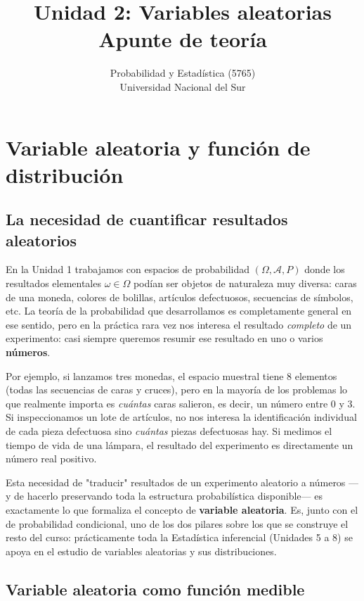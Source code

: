 \documentclass[11pt,a4paper]{article}
\title{Unidad 2: Variables aleatorias \\ \large Apunte de teoría}
\author{Probabilidad y Estadística (5765) \\ Universidad Nacional del Sur}
\date{}
\theoremstyle{plain}
\theoremstyle{definition}
\theoremstyle{remark}
\begin{document}
\maketitle
\tableofcontents
\newpage

\section{Variable aleatoria y función de distribución}

\subsection{La necesidad de cuantificar resultados aleatorios}

En la Unidad 1 trabajamos con espacios de probabilidad $(\Omega,\mathcal{A},P)$ donde los resultados elementales $\omega\in\Omega$ podían ser objetos de naturaleza muy diversa: caras de una moneda, colores de bolillas, artículos defectuosos, secuencias de símbolos, etc. La teoría de la probabilidad que desarrollamos es completamente general en ese sentido, pero en la práctica rara vez nos interesa el resultado \emph{completo} de un experimento: casi siempre queremos resumir ese resultado en uno o varios \textbf{números}.

Por ejemplo, si lanzamos tres monedas, el espacio muestral tiene $8$ elementos (todas las secuencias de caras y cruces), pero en la mayoría de los problemas lo que realmente importa es \emph{cuántas} caras salieron, es decir, un número entre $0$ y $3$. Si inspeccionamos un lote de artículos, no nos interesa la identificación individual de cada pieza defectuosa sino \emph{cuántas} piezas defectuosas hay. Si medimos el tiempo de vida de una lámpara, el resultado del experimento es directamente un número real positivo.

Esta necesidad de "traducir" resultados de un experimento aleatorio a números —y de hacerlo preservando toda la estructura probabilística disponible— es exactamente lo que formaliza el concepto de \textbf{variable aleatoria}. Es, junto con el de probabilidad condicional, uno de los dos pilares sobre los que se construye el resto del curso: prácticamente toda la Estadística inferencial (Unidades 5 a 8) se apoya en el estudio de variables aleatorias y sus distribuciones.

\subsection{Variable aleatoria como función medible}
\end{document}
